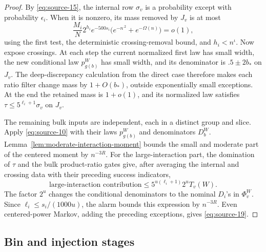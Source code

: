 \begin{proof}
By \eqref{eq:source-15}, the internal row \(\sigma_v\) is a probability except with probability \(\epsilon_i\). When it is nonzero, its mass removed by \(J_v\) is at most
\[
 \frac{M_i}{N}2^{h_i}e^{-500s_i}
       \bigl(e^{-n^{.2}}+e^{-\Omega(n)}\bigr)=o(1),
\]
using the first test, the deterministic crossing-removal bound, and \(h_i<n^\iota\). Now expose crossings. At each step the current normalized first law has small width, the new conditional law \(p_{g(b)}^W\) has small width, and its denominator is \(.5\pm2b_*\) on \(J_v\). The deep-discrepancy calculation from the direct case therefore makes each ratio filter change mass by \(1+O(b_*)\), outside exponentially small exceptions. At the end the retained mass is \(1+o(1)\), and its normalized law satisfies \(\tau\le5^{\ell_i+1}\sigma_v\) on \(J_v\).

The remaining bulk inputs are independent, each in a distinct group and slice. Apply \eqref{eq:source-10} with their laws \(p_{g(b)}^W\) and denominators \(D_b^W\). Lemma~\ref{lem:moderate-interaction-moment} bounds the small and moderate part of the centered moment by \(n^{-3R}\). For the large-interaction part, the domination of \(\tau\) and the bulk product-ratio gates give, after averaging the internal and crossing data with their preceding success indicators,
\[
 \text{large-interaction contribution}
       \le 5^{u(\ell_i+1)}2^u T_v(W).
\]
The factor \(2^u\) changes the conditional denominators to the nominal \(D_i\)'s in \(\Phi_v^W\). Since \(\ell_i\le s_i/(1000u)\), the alarm bounds this expression by \(n^{-3R}\). Even centered-power Markov, adding the preceding exceptions, gives \eqref{eq:source-19}.
\end{proof}

\subsection{Bin and injection stages}
\label{sec:bin-and-injection-stages}

